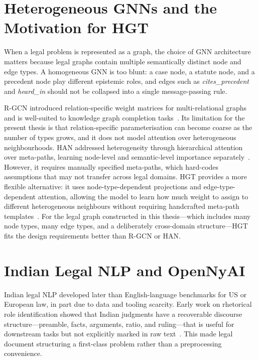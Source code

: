 \section{Heterogeneous GNNs and the Motivation for HGT}

When a legal problem is represented as a graph, the choice of GNN architecture matters because legal graphs contain multiple semantically distinct node and edge types. A homogeneous GNN is too blunt: a case node, a statute node, and a precedent node play different epistemic roles, and edges such as \emph{cites\_precedent} and \emph{heard\_in} should not be collapsed into a single message-passing rule.

R-GCN introduced relation-specific weight matrices for multi-relational graphs and is well-suited to knowledge graph completion tasks~\cite{schlichtkrull2018rgcn}. Its limitation for the present thesis is that relation-specific parameterisation can become coarse as the number of types grows, and it does not model attention over heterogeneous neighbourhoods. HAN addressed heterogeneity through hierarchical attention over meta-paths, learning node-level and semantic-level importance separately~\cite{wang2019han}. However, it requires manually specified meta-paths, which hard-codes assumptions that may not transfer across legal domains. HGT provides a more flexible alternative: it uses node-type-dependent projections and edge-type-dependent attention, allowing the model to learn how much weight to assign to different heterogeneous neighbours without requiring handcrafted meta-path templates~\cite{hu2020hgt}. For the legal graph constructed in this thesis---which includes many node types, many edge types, and a deliberately cross-domain structure---HGT fits the design requirements better than R-GCN or HAN.

\section{Indian Legal NLP and OpenNyAI}

Indian legal NLP developed later than English-language benchmarks for US or European law, in part due to data and tooling scarcity. Early work on rhetorical role identification showed that Indian judgments have a recoverable discourse structure---preamble, facts, arguments, ratio, and ruling---that is useful for downstream tasks but not explicitly marked in raw text~\cite{bhattacharya2019rhetoricalroles}. This made legal document structuring a first-class problem rather than a preprocessing convenience.

